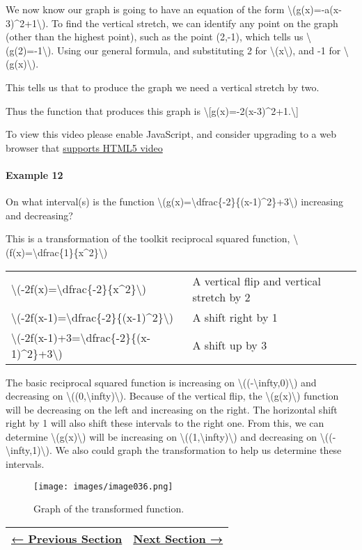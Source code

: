 We now know our graph is going to have an equation of the form
\textbackslash{}(g(x)=-a(x-3)\^{}2+1\textbackslash{}). To find the
vertical stretch, we can identify any point on the graph (other than the
highest point), such as the point (2,-1), which tells us
\textbackslash{}(g(2)=-1\textbackslash{}). Using our general formula,
and substituting 2 for \textbackslash{}(x\textbackslash{}), and -1 for
\textbackslash{}(g(x)\textbackslash{}).

This tells us that to produce the graph we need a vertical stretch by
two.

Thus the function that produces this graph is
\textbackslash{}{[}g(x)=-2(x-3)\^{}2+1.\textbackslash{}{]}

To view this video please enable JavaScript, and consider upgrading to a
web browser that \href{http://videojs.com/html5-video-support/}{supports
HTML5 video}

\hypertarget{example-12}{%
\paragraph{Example 12}\label{example-12}}

On what interval(s) is the function
\textbackslash{}(g(x)=\textbackslash{}dfrac\{-2\}\{(x-1)\^{}2\}+3\textbackslash{})
increasing and decreasing?

This is a transformation of the toolkit reciprocal squared function,
\textbackslash{}(f(x)=\textbackslash{}dfrac\{1\}\{x\^{}2\}\textbackslash{})

\begin{longtable}[]{@{}ll@{}}
\toprule
\endhead
\textbackslash{}(-2f(x)=\textbackslash{}dfrac\{-2\}\{x\^{}2\}\textbackslash{})
& A vertical flip and vertical stretch by 2\tabularnewline
\textbackslash{}(-2f(x-1)=\textbackslash{}dfrac\{-2\}\{(x-1)\^{}2\}\textbackslash{})
& A shift right by 1\tabularnewline
\textbackslash{}(-2f(x-1)+3=\textbackslash{}dfrac\{-2\}\{(x-1)\^{}2\}+3\textbackslash{})
& A shift up by 3\tabularnewline
\bottomrule
\end{longtable}

The basic reciprocal squared function is increasing on
\textbackslash{}((-\textbackslash{}infty,0)\textbackslash{}) and
decreasing on
\textbackslash{}((0,\textbackslash{}infty)\textbackslash{}). Because of
the vertical flip, the \textbackslash{}(g(x)\textbackslash{}) function
will be decreasing on the left and increasing on the right. The
horizontal shift right by 1 will also shift these intervals to the right
one. From this, we can determine \textbackslash{}(g(x)\textbackslash{})
will be increasing on
\textbackslash{}((1,\textbackslash{}infty)\textbackslash{}) and
decreasing on
\textbackslash{}((-\textbackslash{}infty,1)\textbackslash{}). We also
could graph the transformation to help us determine these intervals.

\begin{figure}
\centering
\texttt{[image: images/image036.png]}
\caption{Graph of the transformed function.}
\end{figure}

\begin{longtable}[]{@{}ll@{}}
\toprule
\endhead
\href{section1-1.php}{← Previous Section} & \href{section1-3.php}{Next
Section →}\tabularnewline
\bottomrule
\end{longtable}
